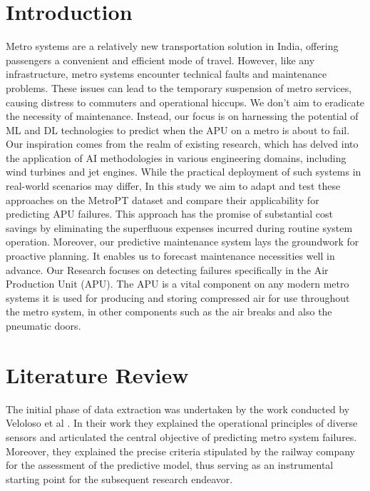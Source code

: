 \documentclass{article}
\begin{document}
\section {Introduction}

Metro systems are a relatively new transportation solution in India, offering
passengers a convenient and efficient mode of travel. However, like any infrastructure, metro systems encounter technical faults and maintenance problems.
These issues can lead to the temporary suspension of metro services, causing
distress to commuters and operational hiccups. We don’t aim to eradicate the necessity of maintenance. Instead, our focus is on harnessing the potential of ML and DL technologies to predict when the APU on a metro is about to fail. Our inspiration comes from the
realm of existing research, which has delved into the application of AI methodologies in various engineering domains, including wind turbines and jet engines.
While the practical deployment of such systems in real-world scenarios may differ, In this study we aim to adapt and test these approaches on the MetroPT dataset and compare their applicability for predicting APU failures. This approach has the promise of
substantial cost savings by eliminating the superfluous expenses incurred during
routine system operation. Moreover, our predictive maintenance system lays the
groundwork for proactive planning. It enables us to forecast maintenance necessities well in advance.
Our Research focuses on detecting failures specifically in the Air Production Unit (APU). The APU is a vital component on any modern metro systems it is used for producing and storing compressed air for use throughout the metro system, in other components such as the air breaks and also the pneumatic
doors.

\section{Literature Review}

The initial phase of data extraction was
undertaken by the work conducted by Veloloso et al \cite{Veloso2022}. In their work they explained the operational principles of diverse sensors
and articulated the central objective of predicting metro system failures. 
Moreover, they explained the precise criteria stipulated by the railway company for the assessment of the predictive model, thus serving as an instrumental starting point for the subsequent research endeavor. \\
\end{document}
